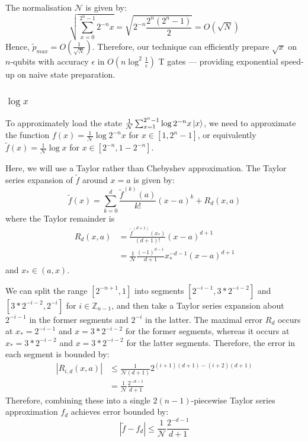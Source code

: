 \documentclass[aps,prx,twocolumn,floatfix,10pt,amssymb,amsfont,amsmath,superscriptaddress,float,nofootinbib,longbibliography,nobalancelastpage]{revtex4-2}
\theoremstyle{empty}
\begin{document}
The normalisation $\mathcal{N}$ is given by:
\begin{equation}
    \sqrt{\sum_{x=0}^{2^n-1}2^{-n} x} = \sqrt{2^{-n} \frac{2^n(2^n -1)}{2}} = O\left(\sqrt{N}\right)
\end{equation}
Hence, $\tilde{p}_{max} = O\left(\frac{1}{\sqrt{N}}\right)$. Therefore, our technique can efficiently prepare $\sqrt{x}$ on $n$-qubits with accuracy $\epsilon$ in $O(n\log^2 \frac{1}{\epsilon})$ T gates --- providing exponential speed-up on naive state preparation.
\subsubsection{$\log x$}
\label{section:inverse} To approximately load the state $\frac{1}{\mathcal{N}}\sum_{x=1}^{2^n-1} \log{2^{-n}x}\ket{x}$, we need to approximate the function $f(x) = \frac{1}{\mathcal{N}}\log{2^{-n}x}$ for $x \in [1, 2^n-1]$, or equivalently $\tilde f(x) =\frac{1}{\mathcal{N}}\log{x}$ for $x \in [2^{-n}, 1-2^{-n}]$. 

Here, we will use a Taylor rather than Chebyshev approximation. The Taylor series expansion of $\tilde f$ around $x=a$ is given by:
\begin{equation}
        \tilde f(x) = \sum_{k=0}^d \frac{\tilde{f}^{(k)}(a)}{k!}(x-a)^k + R_d(x,a)
\end{equation}
where the Taylor remainder is
\begin{align}
    R_d(x,a) &= \frac{\tilde{f}^{(d+1)}(x_*)}{(d+1)!}(x-a)^{d+1} \nonumber \\
            &= \frac{1}{\mathcal{N}} \frac{(-1)^{d-1}}{d+1} x_*^{-d-1}(x-a)^{d+1}
\end{align}
and $x_* \in (a,x)$.

We can split the range $[2^{-n+1}, 1]$ into segments $[2^{-i-1}, 3*2^{-i-2}]$ and $[3*2^{-i-2}, 2^{-i}]$ for $i \in \mathbb{Z}_{n-1}$, and then take a Taylor series expansion about $2^{-i-1}$ in the former segments and $2^{-i}$ in the latter. The maximal error $R_d$ occurs at $x_* = 2^{-i-1}$ and $x=3*2^{-i-2}$ for the former segments, whereas it occurs at $x_* = 3*2^{-i-2}$ and $x=3*2^{-i-2}$ for the latter segments. Therefore, the error in each segment is bounded by:
\begin{align}
    |R_{i,d}(x,a)| &\leq \frac{1}{\mathcal{N}(d+1)}  2^{(i+1)(d+1)-(i+2)(d+1)} \nonumber\\
                &= \frac{1}{\mathcal{N}} \frac{2^{-d-1}}{d+1}
\end{align}
Therefore, combining these into a single $2(n-1)$-piecewise Taylor series approximation $f_d$ achieves error bounded by:
\begin{equation}
     |\tilde f - f_{d}| \leq   \frac{1}{\mathcal{N}} \frac{2^{-d-1}}{d+1}
\end{equation}
\end{document}
